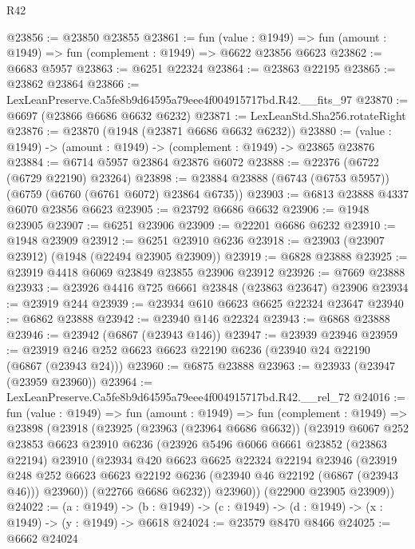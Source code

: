 \begin{lexlean}{R42}
\begin{coremodule}
{@23856 := @23850 @23855
@23861 := fun (value : @1949) =>
  fun (amount : @1949) => fun (complement : @1949) => @6622 @23856 @6623
@23862 := @6683 @5957
@23863 := @6251 @22324
@23864 := @23863 @22195
@23865 := @23862 @23864
@23866 := LexLeanPreserve.Ca5fe8b9d64595a79eee4f004915717bd.R42.__fits_97
@23870 := @6697 (@23866 @6686 @6632 @6232)
@23871 := LexLeanStd.Sha256.rotateRight
@23876 := @23870 (@1948 (@23871 @6686 @6632 @6232))
@23880 := (value : @1949) -> (amount : @1949) -> (complement : @1949) -> @23865 @23876
@23884 := @6714 @5957 @23864 @23876 @6072
@23888 := @22376 (@6722 (@6729 @22190) @23264)
@23898 := @23884 @23888 (@6743 (@6753 @5957)) (@6759 (@6760 (@6761 @6072) @23864 @6735))
@23903 := @6813 @23888 @4337 @6070 @23856 @6623
@23905 := @23792 @6686 @6632
@23906 := @1948 @23905
@23907 := @6251 @23906
@23909 := @22201 @6686 @6232
@23910 := @1948 @23909
@23912 := @6251 @23910 @6236
@23918 := @23903 (@23907 @23912) (@1948 (@22494 @23905 @23909))
@23919 := @6828 @23888
@23925 := @23919 @4418 @6069 @23849 @23855 @23906 @23912
@23926 := @7669 @23888
@23933 := @23926 @4416 @725 @6661 @23848 (@23863 @23647) @23906
@23934 := @23919 @244
@23939 := @23934 @610 @6623 @6625 @22324 @23647
@23940 := @6862 @23888
@23942 := @23940 @146 @22324
@23943 := @6868 @23888
@23946 := @23942 (@6867 (@23943 @146))
@23947 := @23939 @23946
@23959 := @23919 @246 @252 @6623 @6623 @22190 @6236 (@23940 @24 @22190 (@6867 (@23943 @24)))
@23960 := @6875 @23888
@23963 := @23933 (@23947 (@23959 @23960))
@23964 := LexLeanPreserve.Ca5fe8b9d64595a79eee4f004915717bd.R42.__rel_72
@24016 := fun (value : @1949) =>
  fun (amount : @1949) =>
  fun (complement : @1949) =>
  @23898
    (@23918
      (@23925
        (@23963 (@23964 @6686 @6632))
        (@23919
          @6067
          @252
          @23853
          @6623
          @23910
          @6236
          (@23926
            @5496
            @6066
            @6661
            @23852
            (@23863 @22194)
            @23910
            (@23934
              @420
              @6623
              @6625
              @22324
              @22194
              @23946
              (@23919
                @248
                @252
                @6623
                @6623
                @22192
                @6236
                (@23940 @46 @22192 (@6867 (@23943 @46)))
                @23960))
            (@22766 @6686 @6232))
          @23960))
      (@22900 @23905 @23909))
@24022 := (a : @1949) ->
  (b : @1949) -> (c : @1949) -> (d : @1949) -> (x : @1949) -> (y : @1949) -> @6618
@24024 := @23579 @8470 @8466
@24025 := @6662 @24024
}
\end{coremodule}
\end{lexlean}
